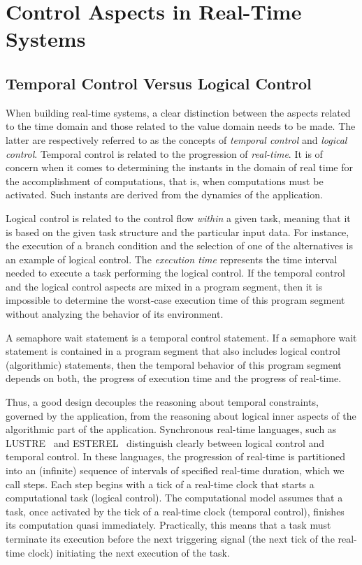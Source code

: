 \section{Control Aspects in Real-Time Systems}

\subsection{Temporal Control Versus Logical Control}
When building real-time systems, a clear distinction between the aspects related to the time 
domain and those related to the value domain needs to be made. The latter are respectively
referred to as the concepts of \emph{temporal control} and \emph{logical control}.
Temporal control is related to the progression of \emph{real-time}. It is of concern when it 
comes to determining the instants in the domain of real time for the accomplishment of 
computations, that is, when computations must be activated.
Such instants are derived from the dynamics of the application. 

Logical control is related to the control flow \emph{within} a given task, meaning that it 
is based on the given task structure and the particular input data. For instance, the execution
of a branch condition and the selection of one of the alternatives is an example of logical
control. The \emph{execution time} represents the time interval needed to execute a task
performing the logical control.
If the temporal control and the logical control aspects are mixed in a program segment,
then it is impossible to determine the worst-case execution time of this program segment without
analyzing the behavior of its environment.
\begin{example}\label{exp:control1}
 A semaphore wait statement is a temporal control statement. If a semaphore
wait statement is contained in a program segment that also includes logical control
(algorithmic) statements, then the temporal behavior of this program segment depends
on both, the progress of execution time and the progress of real-time.
\end{example}
Thus, a good design decouples the reasoning about temporal constraints, governed by the 
application, from the reasoning about logical inner aspects of the algorithmic part of the 
application.
Synchronous real-time languages, such as LUSTRE~\cite{intro:lustre} and 
ESTEREL~\cite{intro:esterel} distinguish clearly between logical control and temporal
control. In these languages, the progression of real-time is partitioned into an
(infinite) sequence of intervals of specified real-time duration, which we call
steps. Each step begins with a tick of a real-time clock that starts a computational
task (logical control). The computational model assumes that a task, once activated
by the tick of a real-time clock (temporal control), finishes its computation quasi
immediately. Practically, this means that a task must terminate its execution before
the next triggering signal (the next tick of the real-time clock) initiating the next
execution of the task.


